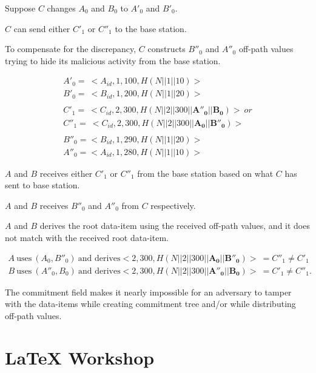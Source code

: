 \documentclass[%
  slidesonly,%
  semlayer%
  ]{seminar}                                  %
\begin{document}
\begin{slide}
        Suppose $C$ changes $A_{0}$ and $B_{0}$ to $A'_{0}$ and $B'_{0}$.

        $C$ can send either $C'_{1}$ or $C''_{1}$ to the base station.
        
        To compensate for the discrepancy, $C$ constructs $B''_{0}$ and $A''_{0}$ off-path values trying to hide its malicious activity from the base station.

        \begin{equation*}
          \begin{array}{l}
            A'_{0} =\ <A_{id},1,100, H(N||1||10)>\\
            B'_{0} =\ <B_{id},1,200, H(N||1||20)>\\
            \\
            C'_{1} =\ <C_{id},2,300, H(N||2||300||\mathbf{A''_{0}}||\mathbf{B_{0}})>\ or \\ 
            C''_{1} =\ <C_{id},2,300, H(N||2||300||\mathbf{A_{0}}||\mathbf{B''_{0}})>\\
            \\
            B''_{0} = <B_{id},1,290,H(N||1||20)>\\
            A''_{0} = <A_{id},1,280,H(N||1||10)>
          \end{array}
        \end{equation*}
        \vfill
        \clearpage

        $A$ and $B$ receives either $C'_{1}$ or $C''_{1}$ from the base station based on what $C$ has sent to base station.

        $A$ and $B$ receives $B''_{0}$ and $A''_{0}$ from $C$ respectively.

        $A$ and $B$ derives the root data-item using the received off-path values, and it does not match with the received root data-item.

        \begin{equation*}
          \begin{array}{l}
            A\ \mbox{uses}\ (A_{0}, B''_{0})\ \mbox{and derives} <2,300,H(N||2||300||\mathbf{A_{0}}||\mathbf{B''_{0}})>\  = C''_{1} \neq C'_{1} \\
            B\ \mbox{uses}\ (A''_{0}, B_{0})\ \mbox{and derives} <2,300,H(N||2||300||\mathbf{A''_{0}}||\mathbf{B_{0}})>\  = C'_{1} \neq C''_{1}.
          \end{array}
        \end{equation*}

        The commitment field makes it nearly impossible for an adversary to tamper with the data-items while creating commitment tree and/or while distributing off-path values.
        \vfill
        \clearpage

\clearpage

\section*{\LaTeX{ } Workshop}

\vspace{.75in}

\end{slide}
\end{document}
